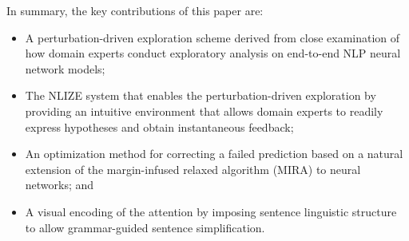In summary, the key contributions of this paper are:
\begin{itemize}
    \item A perturbation-driven exploration scheme derived from close examination of how domain experts conduct exploratory analysis on end-to-end NLP neural network models;

    \item The NLIZE system that enables the perturbation-driven exploration by providing an intuitive environment that allows domain experts to readily express hypotheses and obtain instantaneous feedback;

    \item An optimization method for correcting a failed prediction based on a natural extension of the margin-infused relaxed algorithm (MIRA) to neural networks; and

    \item A visual encoding of the attention by imposing sentence linguistic structure to allow grammar-guided sentence simplification.

\end{itemize}
%




